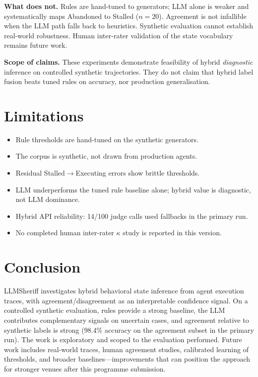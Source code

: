 \documentclass[conference]{IEEEtran}
\begin{document}
\textbf{What does not.} Rules are hand-tuned to generators; LLM alone is weaker and
systematically maps Abandoned to Stalled ($n{=}20$). Agreement is not infallible when the
LLM path falls back to heuristics. Synthetic evaluation cannot establish real-world
robustness. Human inter-rater validation of the state vocabulary remains future work.

\textbf{Scope of claims.} These experiments demonstrate feasibility of hybrid
\emph{diagnostic} inference on controlled synthetic trajectories. They do not claim that
hybrid label fusion beats tuned rules on accuracy, nor production generalisation.

\section{Limitations}

\begin{itemize}
\item Rule thresholds are hand-tuned on the synthetic generators.
\item The corpus is synthetic, not drawn from production agents.
\item Residual Stalled$\rightarrow$Executing errors show brittle thresholds.
\item LLM underperforms the tuned rule baseline alone; hybrid value is diagnostic, not
LLM dominance.
\item Hybrid API reliability: 14/100 judge calls used fallbacks in the primary run.
\item No completed human inter-rater $\kappa$ study is reported in this version.
\end{itemize}

\section{Conclusion}

LLMSheriff investigates hybrid behavioral state inference from agent execution traces,
with agreement/disagreement as an interpretable confidence signal. On a controlled
synthetic evaluation, rules provide a strong baseline, the LLM contributes complementary
signals on uncertain cases, and agreement relative to synthetic labels is strong
(98.4\% accuracy on the agreement subset in the primary run).
The work is exploratory and scoped to the evaluation performed. Future work includes
real-world traces, human agreement studies, calibrated learning of thresholds, and broader
baselines---improvements that can position the approach for stronger venues after this
programme submission.
\end{document}
